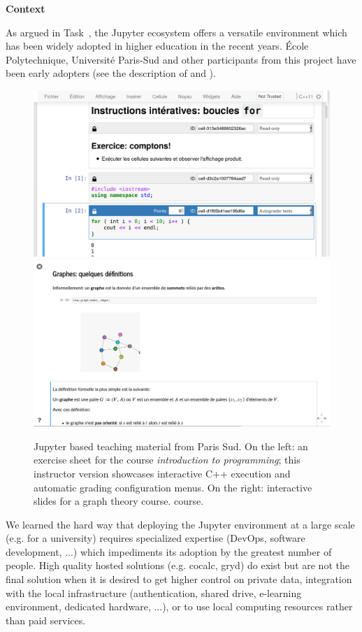 \begin{task}[
  title=Demonstrator: enriched teaching with Jupyter,
  id=teaching,
  lead=EP,
  PM=6, %
  wphases={0-48},
  partners={EGI,UIO,UPSUD,XFEL}
  ]

  \textbf{Context}

  As argued in Task~, the Jupyter
  ecosystem offers a versatile environment which has been widely
  adopted in higher education in the recent years. École
  Polytechnique, Université Paris-Sud and other participants from this
  project have been early adopters (see the description of 
  and ).

  \begin{figure}[ht!]\centering
  \includegraphics[width=.45\textwidth]{images/teaching-cling}\quad
  \includegraphics[width=.45\textwidth]{images/teaching-graphs}
  \caption{Jupyter based teaching material from Paris Sud. On the
    left: an exercise sheet for the course \emph{introduction to
      programming}; this instructor version showcases interactive C++
    execution and automatic grading configuration menus. On the right:
    interactive slides for a graph theory course.
    course.}\label{fig:teaching-cling}
  \end{figure}

  We learned the hard way that deploying the Jupyter environment at a
  large scale (e.g. for a university) requires specialized expertise
  (DevOps, software development, ...) which impediments its adoption
  by the greatest number of people. High quality hosted solutions
  (e.g. cocalc, gryd) do exist but are not the final solution when it
  is desired to get higher control on private data, integration with
  the local infrastructure (authentication, shared drive, e-learning
  environment, dedicated hardware, ...), or to use local computing
  resources rather than paid services.


\end{task}
